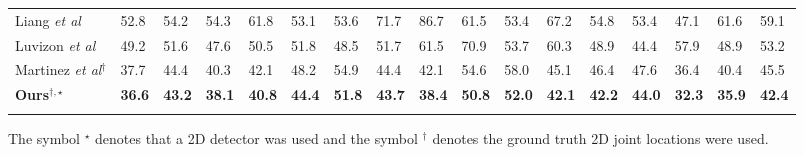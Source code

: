 \documentclass{bmvc2k}
\def\etal{\emph{et al}\bmvaOneDot}
\begin{document}
\begin{table}[ht]
\begin{center}
\begin{tabular}{p{1.5cm}p{0.25cm}p{0.25cm}p{0.25cm}p{0.25cm}p{0.25cm}p{0.25cm}p{0.25cm}p{0.25cm}p{0.25cm}p{0.25cm}p{0.25cm}p{0.25cm}p{0.25cm}p{0.25cm}p{0.25cm}p{0.25cm}}
{\tiny Liang \etal \cite{LIANG20181}} & {\tiny 52.8} & {\tiny 54.2} & {\tiny 54.3} & {\tiny 61.8} & {\tiny 53.1} & {\tiny 53.6} & {\tiny 71.7} & {\tiny 86.7} & {\tiny 61.5} & {\tiny 53.4} & {\tiny 67.2} & {\tiny 54.8} & {\tiny 53.4} & {\tiny 47.1} & {\tiny 61.6} & {\tiny 59.1} \\
\cellcolor{gray!30} {\tiny Luvizon \etal \cite{luvizon20182d}} & \cellcolor{gray!30} {\tiny 49.2} & \cellcolor{gray!30} {\tiny 51.6} & \cellcolor{gray!30} {\tiny 47.6} & \cellcolor{gray!30} {\tiny 50.5} & \cellcolor{gray!30} {\tiny 51.8} & \cellcolor{gray!30} {\tiny 48.5} & \cellcolor{gray!30} {\tiny 51.7} & \cellcolor{gray!30} {\tiny 61.5} & \cellcolor{gray!30} {\tiny 70.9} & \cellcolor{gray!30} {\tiny 53.7} & \cellcolor{gray!30} {\tiny 60.3} & \cellcolor{gray!30} {\tiny 48.9} & \cellcolor{gray!30} {\tiny 44.4} & \cellcolor{gray!30} {\tiny 57.9} & \cellcolor{gray!30} {\tiny 48.9} & \cellcolor{gray!30} {\tiny 53.2} \\
 {\tiny Martinez \etal \cite{martinez_2017_3dbaseline}$^{\dagger}$} &  {\tiny 37.7} &  {\tiny 44.4} &  {\tiny 40.3} &  {\tiny 42.1} &  {\tiny 48.2} &  {\tiny 54.9} &  {\tiny 44.4} &  {\tiny 42.1} &  {\tiny 54.6} &  {\tiny 58.0} &  {\tiny 45.1} &  {\tiny 46.4} &  {\tiny 47.6} &  {\tiny 36.4} &  {\tiny 40.4} &  {\tiny 45.5} \\
\hline
\cellcolor{gray!30} {\tiny \textbf{Ours}$^{\dagger,\star}$} & \cellcolor{gray!30} {\tiny \textbf{36.6}} & \cellcolor{gray!30} {\tiny \textbf{43.2}} & \cellcolor{gray!30} {\tiny \textbf{38.1}} & \cellcolor{gray!30} {\tiny \textbf{40.8}} & \cellcolor{gray!30} {\tiny \textbf{44.4}} & \cellcolor{gray!30} {\tiny \textbf{51.8}} & \cellcolor{gray!30} {\tiny \textbf{43.7}} & \cellcolor{gray!30} {\tiny \textbf{38.4}} & \cellcolor{gray!30} {\tiny \textbf{50.8}} & \cellcolor{gray!30} {\tiny \textbf{52.0}} & \cellcolor{gray!30} {\tiny \textbf{42.1}} & \cellcolor{gray!30} {\tiny \textbf{42.2}} & \cellcolor{gray!30} {\tiny \textbf{44.0}} & \cellcolor{gray!30} {\tiny \textbf{32.3}} & \cellcolor{gray!30} {\tiny \textbf{35.9}} & \cellcolor{gray!30} {\tiny \textbf{42.4}}\\
\hline
\hline \\[-0.75cm]                
\end{tabular}
\end{center}
\scriptsize{\hspace*{0.25cm} The symbol $^{\star}$ denotes that a 2D detector was used and the symbol $^{\dagger}$ denotes the ground truth 2D joint locations were used.} \\[-0.3cm]
\end{table} 
\end{document}
